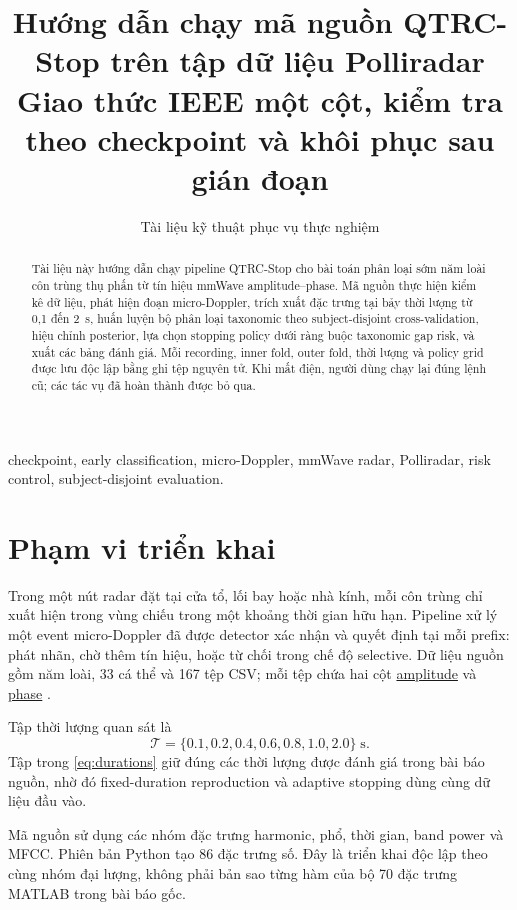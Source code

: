\documentclass[12pt,draftclsnofoot,onecolumn]{IEEEtran}
\title{Hướng dẫn chạy mã nguồn QTRC-Stop trên tập dữ liệu Polliradar\\
\large Giao thức IEEE một cột, kiểm tra theo checkpoint và khôi phục sau gián đoạn}
\author{Tài liệu kỹ thuật phục vụ thực nghiệm}
\newcommand{\code}[1]{\url{#1}}
\begin{document}
\maketitle

\begin{abstract}
Tài liệu này hướng dẫn chạy pipeline QTRC-Stop cho bài toán phân loại sớm năm loài côn trùng thụ phấn từ tín hiệu mmWave amplitude--phase. Mã nguồn thực hiện kiểm kê dữ liệu, phát hiện đoạn micro-Doppler, trích xuất đặc trưng tại bảy thời lượng từ 0,1 đến 2~s, huấn luyện bộ phân loại taxonomic theo subject-disjoint cross-validation, hiệu chỉnh posterior, lựa chọn stopping policy dưới ràng buộc taxonomic gap risk, và xuất các bảng đánh giá. Mỗi recording, inner fold, outer fold, thời lượng và policy grid được lưu độc lập bằng ghi tệp nguyên tử. Khi mất điện, người dùng chạy lại đúng lệnh cũ; các tác vụ đã hoàn thành được bỏ qua.
\end{abstract}

\begin{IEEEkeywords}
checkpoint, early classification, micro-Doppler, mmWave radar, Polliradar, risk control, subject-disjoint evaluation.
\end{IEEEkeywords}

\section{Phạm vi triển khai}

Trong một nút radar đặt tại cửa tổ, lối bay hoặc nhà kính, mỗi côn trùng chỉ xuất hiện trong vùng chiếu trong một khoảng thời gian hữu hạn. Pipeline xử lý một event micro-Doppler đã được detector xác nhận và quyết định tại mỗi prefix: phát nhãn, chờ thêm tín hiệu, hoặc từ chối trong chế độ selective. Dữ liệu nguồn gồm năm loài, 33 cá thể và 167 tệp CSV; mỗi tệp chứa hai cột \code{amplitude} và \code{phase} \cite{antony2026}.

Tập thời lượng quan sát là
\begin{equation}
\mathcal{T}=\{0.1,0.2,0.4,0.6,0.8,1.0,2.0\}\;\mathrm{s}.
\label{eq:durations}
\end{equation}
Tập trong \eqref{eq:durations} giữ đúng các thời lượng được đánh giá trong bài báo nguồn, nhờ đó fixed-duration reproduction và adaptive stopping dùng cùng dữ liệu đầu vào.

Mã nguồn sử dụng các nhóm đặc trưng harmonic, phổ, thời gian, band power và MFCC. Phiên bản Python tạo 86 đặc trưng số. Đây là triển khai độc lập theo cùng nhóm đại lượng, không phải bản sao từng hàm của bộ 70 đặc trưng MATLAB trong bài báo gốc.
\end{document}
